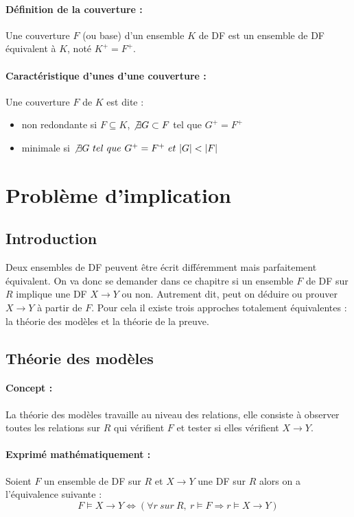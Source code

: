 \documentclass[10pt,a4paper]{article}
\begin{document}
\paragraph{Définition de la couverture :} Une couverture $F$ (ou base) d'un ensemble $K$ de DF est un ensemble de DF équivalent à $K$, noté $K^{+} = F^{+}$.

\paragraph{Caractéristique d'unes d'une couverture :} Une couverture $F$ de $K$ est dite :
\begin{itemize}
\item non redondante si $F \subseteq K$, $\not\exists G \subset F$ tel que $G^{+} = F^{+}$
\item minimale si $\not\exists G\ tel\ que\ G^{+}=F^{+}\ et\ |G|<|F|$
\end{itemize}

\section{Problème d'implication}
\subsection{Introduction}
Deux ensembles de DF peuvent être écrit différemment mais parfaitement équivalent. On va donc se demander dans ce chapitre si un ensemble $F$ de DF sur $R$ implique une DF $X \rightarrow Y$ ou non. Autrement dit, peut on déduire ou prouver $X \rightarrow Y$ à partir de $F$. Pour cela il existe trois approches totalement équivalentes : la théorie des modèles et la théorie de la preuve.

\subsection{Théorie des modèles}

\paragraph{Concept :} La théorie des modèles travaille au niveau des relations, elle consiste à observer toutes les relations sur $R$ qui vérifient $F$ et tester si elles vérifient $X \rightarrow Y$.\\

\paragraph{Exprimé mathématiquement :} Soient $F$ un ensemble de DF sur $R$ et $X \rightarrow Y$ une DF sur $R$ alors on a l'équivalence suivante :
$$F \models X \rightarrow Y \Leftrightarrow (\forall r\  sur\ R,\ r \models F \Rightarrow r\models X \rightarrow Y)$$
\end{document}
